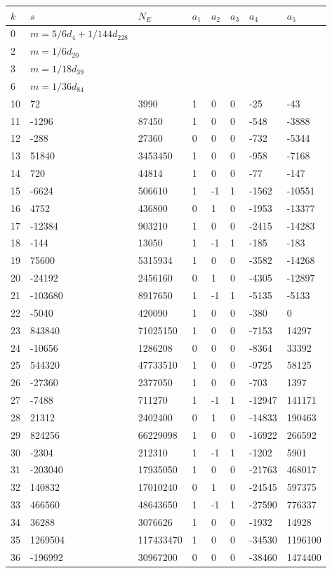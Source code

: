 \documentclass{amsart}
\begin{document}
\begin{longtable}{|l|l|l|lllll|}
\hline
$k$ & $s$ & $N_E$ & $a_1$ & $a_2$ & $a_3$ & $a_4$ & $a_5$\\
\hline
0&$m=5/6d_{4}+1/144d_{228}$&&\multicolumn{5}{c|}{}\\
2&$m=1/6d_{20}$&&\multicolumn{5}{c|}{}\\
3&$m=1/18d_{39}$&&\multicolumn{5}{c|}{}\\
6&$m=1/36d_{84}$&&\multicolumn{5}{c|}{}\\
10&72&3990&1&0&0&-25&-43\\
11&-1296&87450&1&0&0&-548&-3888\\
12&-288&27360&0&0&0&-732&-5344\\
13&51840&3453450&1&0&0&-958&-7168\\
14&720&44814&1&0&0&-77&-147\\
15&-6624&506610&1&-1&1&-1562&-10551\\
16&4752&436800&0&1&0&-1953&-13377\\
17&-12384&903210&1&0&0&-2415&-14283\\
18&-144&13050&1&-1&1&-185&-183\\
19&75600&5315934&1&0&0&-3582&-14268\\
20&-24192&2456160&0&1&0&-4305&-12897\\
21&-103680&8917650&1&-1&1&-5135&-5133\\
22&-5040&420090&1&0&0&-380&0\\
23&843840&71025150&1&0&0&-7153&14297\\
24&-10656&1286208&0&0&0&-8364&33392\\
25&544320&47733510&1&0&0&-9725&58125\\
26&-27360&2377050&1&0&0&-703&1397\\
27&-7488&711270&1&-1&1&-12947&141171\\
28&21312&2402400&0&1&0&-14833&190463\\
29&824256&66229098&1&0&0&-16922&266592\\
30&-2304&212310&1&-1&1&-1202&5901\\
31&-203040&17935050&1&0&0&-21763&468017\\
32&140832&17010240&0&1&0&-24545&597375\\
33&466560&48643650&1&-1&1&-27590&776337\\
34&36288&3076626&1&0&0&-1932&14928\\
35&1269504&117433470&1&0&0&-34530&1196100\\
36&-196992&30967200&0&0&0&-38460&1474400\\

\end{longtable}
\end{document}
